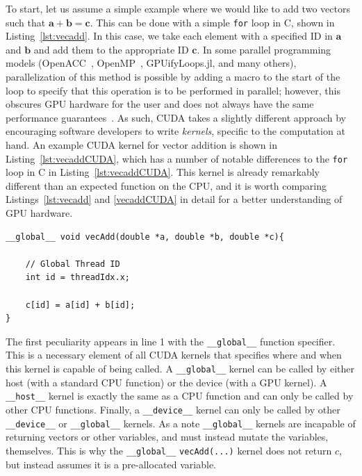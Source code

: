 To start, let us assume a simple example where we would like to add two vectors such that $\mathbf{a} + \mathbf{b} = \mathbf{c}$.
This can be done with a simple \texttt{for} loop in C, shown in Listing~\ref{lst:vecadd}.
In this case, we take each element with a specified ID in $\mathbf{a}$ and $\mathbf{b}$ and add them to the appropriate ID $\mathbf{c}$.
In some parallel programming models (OpenACC~\cite{wienke2012}, OpenMP~\cite{chandra2001}, GPUifyLoops.jl, and many others), parallelization of this method is possible by adding a macro to the start of the loop to specify that this operation is to be performed in parallel; however, this obscures GPU hardware for the user and does not always have the same performance guarantees~\cite{reyes2012}.
As such, CUDA takes a slightly different approach by encouraging software developers to write \textit{kernels}, specific to the computation at hand.
An example CUDA kernel for vector addition is shown in Listing~\ref{lst:vecaddCUDA}, which has a number of notable differences to the \texttt{for} loop in C in Listing~\ref{lst:vecaddCUDA}.
This kernel is already remarkably different than an expected function on the CPU, and it is worth comparing Listings~\ref{lst:vecadd} and \ref{vecaddCUDA} in detail for a better understanding of GPU hardware.

\begin{lstlisting}[float,label=lst:vecaddCUDA, style=c++,caption=An example of a vector addition kernel in CUDA]
__global__ void vecAdd(double *a, double *b, double *c){

    // Global Thread ID
    int id = threadIdx.x;

    c[id] = a[id] + b[id];
}
\end{lstlisting}

The first peculiarity appears in line 1 with the \texttt{\_\_global\_\_} function specifier.
This is a necessary element of all CUDA kernels that specifies where and when this kernel is capable of being called.
A \texttt{\_\_global\_\_} kernel can be called by either host (with a standard CPU function) or the device (with a GPU kernel).
A \texttt{\_\_host\_\_} kernel is exactly the same as a CPU function and can only be called by other CPU functions.
Finally, a \texttt{\_\_device\_\_} kernel can only be called by other \texttt{\_\_device\_\_} or \texttt{\_\_global\_\_} kernels.
As a note \texttt{\_\_global\_\_} kernels are incapable of returning vectors or other variables, and must instead mutate the variables, themselves.
This is why the \texttt{\_\_global\_\_} \texttt{vecAdd(...)} kernel does not return $c$, but instead assumes it is a pre-allocated variable.

